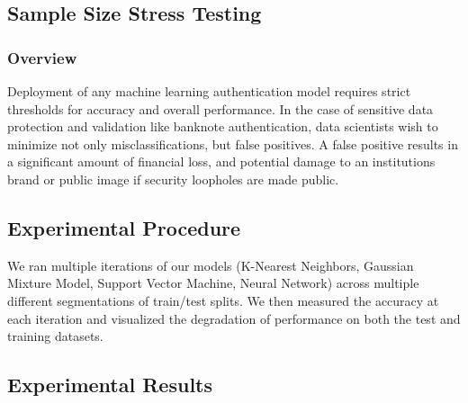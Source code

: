 \documentclass{article}
\begin{document}
\subsection{Sample Size Stress Testing}
\subsubsection{Overview}

Deployment of any machine learning authentication model requires strict thresholds for accuracy and overall performance. In the case of sensitive data protection and validation like banknote authentication, data scientists wish to minimize not only misclassifications, but false positives. A false positive results in a significant amount of financial loss, and potential damage to an institutions brand or public image if security loopholes are made public.

\subsection{Experimental Procedure}

We ran multiple iterations of our models (K-Nearest Neighbors, Gaussian Mixture Model, Support Vector Machine, Neural Network) across multiple different segmentations of train/test splits. We then measured the accuracy at each iteration and visualized the degradation of performance on both the test and training datasets.

\subsection{Experimental Results}
\end{document}
